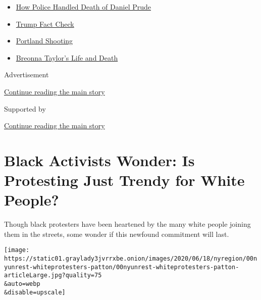 \begin{itemize}
\tightlist
\item
  \href{https://www.nytimes3xbfgragh.onion/2020/09/04/nyregion/rochester-police-daniel-prude.html?name=styln-george-floyd\&region=TOP_BANNER\&block=storyline_menu_recirc\&action=click\&pgtype=Article\&impression_id=326d33d0-f1ba-11ea-bd45-53512389bd45\&variant=undefined}{How
  Police Handled Death of Daniel Prude}
\item
  \href{https://www.nytimes3xbfgragh.onion/2020/09/01/us/politics/trump-fact-check-protests.html?name=styln-george-floyd\&region=TOP_BANNER\&block=storyline_menu_recirc\&action=click\&pgtype=Article\&impression_id=326d33d1-f1ba-11ea-bd45-53512389bd45\&variant=undefined}{Trump
  Fact Check}
\item
  \href{https://www.nytimes3xbfgragh.onion/2020/08/30/us/portland-shooting-explained.html?name=styln-george-floyd\&region=TOP_BANNER\&block=storyline_menu_recirc\&action=click\&pgtype=Article\&impression_id=326d33d2-f1ba-11ea-bd45-53512389bd45\&variant=undefined}{Portland
  Shooting}
\item
  \href{https://www.nytimes3xbfgragh.onion/2020/08/30/us/breonna-taylor-police-killing.html?name=styln-george-floyd\&region=TOP_BANNER\&block=storyline_menu_recirc\&action=click\&pgtype=Article\&impression_id=326d33d3-f1ba-11ea-bd45-53512389bd45\&variant=undefined}{Breonna
  Taylor's Life and Death}
\end{itemize}

Advertisement

\protect\hyperlink{after-top}{Continue reading the main story}

Supported by

\protect\hyperlink{after-sponsor}{Continue reading the main story}

\hypertarget{black-activists-wonder-is-protesting-just-trendy-for-white-people}{%
\section{Black Activists Wonder: Is Protesting Just Trendy for White
People?}\label{black-activists-wonder-is-protesting-just-trendy-for-white-people}}

Though black protesters have been heartened by the many white people
joining them in the streets, some wonder if this newfound commitment
will last.

\texttt{[image: https://static01.graylady3jvrrxbe.onion/images/2020/06/18/nyregion/00nyunrest-whiteprotesters-patton/00nyunrest-whiteprotesters-patton-articleLarge.jpg?quality=75\\\&auto=webp\\\&disable=upscale]}

